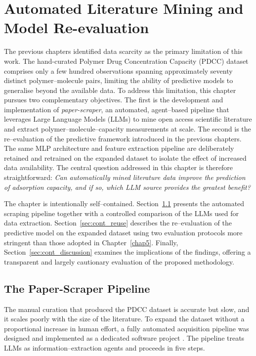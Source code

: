 \chapter{Automated Literature Mining and Model Re-evaluation}
\label{chap6}

The previous chapters identified data scarcity as the primary limitation of this work. The hand-curated Polymer Drug Concentration Capacity (PDCC) dataset comprises only a few hundred observations spanning approximately seventy distinct polymer--molecule pairs, limiting the ability of predictive models to generalise beyond the available data.
To address this limitation, this chapter pursues two complementary objectives. The first is the development and implementation of \emph{paper-scraper}, an automated, agent--based pipeline that leverages Large Language Models (LLMs) to mine open access scientific literature and extract polymer--molecule--capacity measurements at scale. The second is the re--evaluation of the predictive framework introduced in the previous chapters. The same MLP architecture and feature extraction pipeline are deliberately retained and retrained on the expanded dataset to isolate the effect of increased data availability.
The central question addressed in this chapter is therefore straightforward: \emph{Can automatically mined literature data improve the prediction of adsorption capacity, and if so, which LLM source provides the greatest benefit?}

The chapter is intentionally self--contained. Section~\ref{sec:cont_scraper} presents the automated scraping pipeline together with a controlled comparison of the LLMs used for data extraction. Section~\ref{sec:cont_reuse} describes the re--evaluation of the predictive model on the expanded dataset using two evaluation protocols more stringent than those adopted in Chapter~\ref{chap5}. Finally, Section~\ref{sec:cont_discussion} examines the implications of the findings, offering a transparent and largely cautionary evaluation of the proposed methodology.

\section{The Paper-Scraper Pipeline}
\label{sec:cont_scraper}

The manual curation that produced the PDCC dataset is accurate but slow, and it scales poorly with the size of the literature. To expand the dataset without a proportional increase in human effort, a fully automated acquisition pipeline was designed and implemented as a dedicated software project \cite{repo_scraper}. The pipeline treats LLMs as information--extraction agents and proceeds in five steps.

